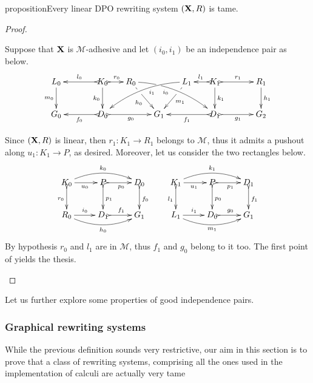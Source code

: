 \documentclass[a4paper,UKenglish,cleveref,pdftex, thm-restate,numberwithinsect]{lipics}
\def\R{\mathsf{R}}
\def\X{\textbf {\textup{X}}}
\begin{document}
\begin{theoremEnd}[category=sec3]{proposition}\label{prop:equi}Every linear DPO rewriting system $(\X, \R)$ is tame.
\end{theoremEnd}
\begin{proof} 
	\begin{proofEnd}
		Suppose that $\X$ is $\mathcal{M}$-adhesive and let $(i_0, i_1)$ be an independence pair as below.
		\[\xymatrix@C=15pt{L_0 \ar[d]_{m_0}&& K_0 \ar[d]_{k_0}\ar@{>->}[ll]_{l_0} \ar@{>->}[r]^{r_0} & R_0 \ar@/^.35cm/[drrr]|(.3)\hole_(.4){i_0} \ar[dr]|(.3)\hole_{h_0} && L_1 \ar@/_.35cm/[dlll]^(.4){i_1} \ar[dl]|(.3)\hole^{m_1}& K_1 \ar[d]^{k_1}\ar@{>->}[l]_{l_1} \ar@{>->}[rr]^{r_1} && R_1 \ar[d]^{h_1} \\G_0 && \ar@{>->}[ll]^{f_0} D_0 \ar@{>->}[rr]_{g_0}&& G_1  && \ar@{>->}[ll]^{f_1} D_1 \ar@{>->}[rr]_{g_1}&& G_2}\]
	
Since $(\X, \R)$ is linear, then $r_1\colon K_1\to R_1$ belongs to $\mathcal{M}$, thus it admits a pushout along $u_1\colon K_1\to P$, as desired. Moreover, let us consider the two rectangles below.
			\[\xymatrix{K_0 \ar@/^.4cm/[rr]^{k_0}\ar@{>->}[d]_{r_0}\ar[r]_{u_0} &P\ar@{>->}[d]^{p_1} \ar@{>->}[r]_{p_0} & D_0 \ar@{>->}[d]^{f_0}& K_1 \ar@/^.4cm/[rr]^{k_1}\ar@{>->}[d]_{l_1}\ar[r]_{u_1} &P\ar@{>->}[d]^{p_0} \ar@{>->}[r]_{p_1} & D_1 \ar@{>->}[d]^{f_1}\\ 	R_0 \ar@/_.4cm/[rr]_{h_0} \ar[r]^{i_0}&D_1 \ar@{>->}[r]^{f_1} & G_1& L_1 \ar@/_.4cm/[rr]_{m_1} \ar[r]^{i_1}&D_0 \ar@{>->}[r]^{g_0} & G_1} \]
	By hypothesis $r_0$ and $l_1$ are in $\mathcal{M}$, thus $f_1$ and $g_0$ belong to it too. The first point of   yields the thesis. 
	\end{proofEnd}
\end{proof}

Let us further explore some properties of good independence pairs.




\subsubsection{Graphical rewriting systems}\label{subsubsec:graphical}

\begin{definition}
\end{definition}
While the previous definition sounds very restrictive, our aim in this section is to prove that a class of rewriting systems, comprising all the ones used in the implementation of calculi are actually very tame
\end{document}
